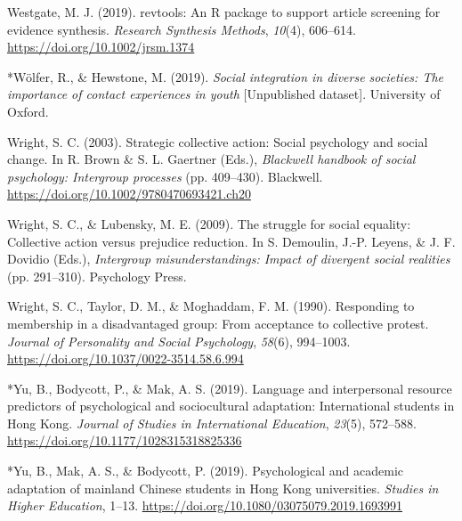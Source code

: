 \documentclass[12pt, letterpaper]{article}
\begin{document}
\leavevmode\hypertarget{ref-westgate_revtools:_2019}{}%
Westgate, M. J. (2019). revtools: An R package to support article
screening for evidence synthesis. \emph{Research Synthesis Methods},
\emph{10}(4), 606--614. \url{https://doi.org/10.1002/jrsm.1374}

\leavevmode\hypertarget{ref-2383}{}%
*Wölfer, R., \& Hewstone, M. (2019). \emph{Social integration in diverse
societies: The importance of contact experiences in youth}
{[}Unpublished dataset{]}. University of Oxford.

\leavevmode\hypertarget{ref-brown_strategic_2003}{}%
Wright, S. C. (2003). Strategic collective action: Social psychology and
social change. In R. Brown \& S. L. Gaertner (Eds.), \emph{Blackwell
handbook of social psychology: Intergroup processes} (pp. 409--430).
Blackwell. \url{https://doi.org/10.1002/9780470693421.ch20}

\leavevmode\hypertarget{ref-wright_struggle_2009}{}%
Wright, S. C., \& Lubensky, M. E. (2009). The struggle for social
equality: Collective action versus prejudice reduction. In S. Demoulin,
J.-P. Leyens, \& J. F. Dovidio (Eds.), \emph{Intergroup
misunderstandings: Impact of divergent social realities} (pp. 291--310).
Psychology Press.

\leavevmode\hypertarget{ref-wright_responding_1990}{}%
Wright, S. C., Taylor, D. M., \& Moghaddam, F. M. (1990). Responding to
membership in a disadvantaged group: From acceptance to collective
protest. \emph{Journal of Personality and Social Psychology},
\emph{58}(6), 994--1003.
\url{https://doi.org/10.1037/0022-3514.58.6.994}

\leavevmode\hypertarget{ref-1395}{}%
*Yu, B., Bodycott, P., \& Mak, A. S. (2019). Language and interpersonal
resource predictors of psychological and sociocultural adaptation:
International students in Hong Kong. \emph{Journal of Studies in
International Education}, \emph{23}(5), 572--588.
\url{https://doi.org/10.1177/1028315318825336}

\leavevmode\hypertarget{ref-3000}{}%
*Yu, B., Mak, A. S., \& Bodycott, P. (2019). Psychological and academic
adaptation of mainland Chinese students in Hong Kong universities.
\emph{Studies in Higher Education}, 1--13.
\url{https://doi.org/10.1080/03075079.2019.1693991}

\endgroup
\end{document}
